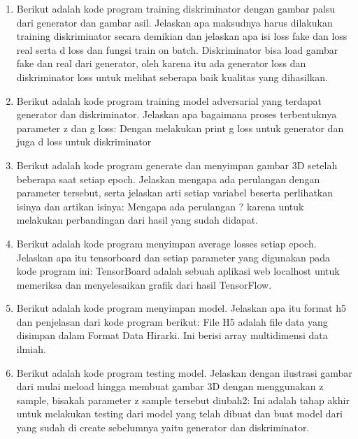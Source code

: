 \begin{enumerate}
		

        	\item Berikut adalah kode program training diskriminator dengan gambar palsu dari generator dan gambar asil. Jelaskan apa maksudnya harus dilakukan training diskriminator secara demikian dan jelaskan apa isi loss fake dan loss real serta d loss dan fungsi train on batch.
Diskriminator bisa load gambar fake dan real dari generator, oleh karena itu ada generator loss dan diskriminator loss untuk melihat seberapa baik kualitas yang dihasilkan.

		

        	\item Berikut adalah kode program training model adversarial yang terdapat generator dan diskriminator. Jelaskan apa bagaimana proses terbentuknya parameter z dan g loss:
Dengan melakukan print g loss untuk generator dan juga d loss untuk diskriminator

		

        	\item Berikut adalah kode program generate dan menyimpan gambar 3D setelah beberapa saat setiap epoch. Jelaskan mengapa ada perulangan dengan parameter tersebut, serta jelaskan arti setiap variabel beserta perlihatkan isinya dan artikan isinya:
Mengapa ada perulangan ? karena untuk melakukan perbandingan dari hasil yang sudah didapat.

		

        	\item Berikut adalah kode program menyimpan average losses setiap epoch. Jelaskan apa itu tensorboard dan setiap parameter yang digunakan pada kode program ini:
TensorBoard adalah sebuah aplikasi web localhost untuk memeriksa dan menyelesaikan grafik dari hasil TensorFlow.

		

        	\item Berikut adalah kode program menyimpan model. Jelaskan apa itu format h5 dan penjelasan dari kode program berikut:
File H5 adalah file data yang disimpan dalam Format Data Hirarki. Ini berisi array multidimensi data ilmiah.

		

        	\item Berikut adalah kode program testing model. Jelaskan dengan ilustrasi gambar dari mulai meload hingga membuat gambar 3D dengan menggunakan z sample, bisakah parameter z sample tersebut diubah2:
Ini adalah tahap akhir untuk melakukan testing dari model yang telah dibuat dan buat model dari yang sudah di create sebelumnya yaitu generator dan diskriminator.

		

\end{enumerate}

